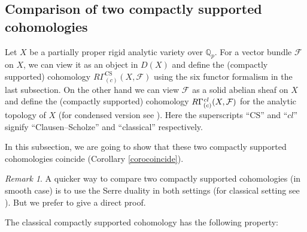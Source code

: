 \documentclass[a4paper,10pt]{amsart}
\theoremstyle{remark}
\newtheorem{remark}[theorem]{Remark}
\theoremstyle{definition}
\theoremstyle{plain}
\numberwithin{equation}{section}
\newcommand{\bbQ}{{\mathbb Q}}
\newcommand{\calF}{{\mathcal F}}
\newcommand{\CS}{\ensuremath{\mathrm{CS}}}
\begin{document}
\subsection{Comparison of two compactly supported cohomologies}\label{subseccompare}
Let $X$ be a partially proper rigid analytic variety over $\bbQ_p$. For a vector bundle $\calF$ on $X$, we can view it as an object in $D(X)$ and define the (compactly supported) cohomology $R\Gamma^{\CS}_{(c)}(X,\calF)$ using the six functor formalism in the last subsection. On the other hand we can view $\calF$ as a solid abelian sheaf on $X$ and define the (compactly supported) cohomology $R\Gamma_{(c)}^{\it cl}(X,\calF)$ for the analytic topology of $X$ \cite{abeLazda2025proper} (for condensed version see \cite[Appendix A]{li2026locallyanalyticvectorscompleted}). Here the superscripts ``$\CS$'' and ``$\mathit{cl}$'' signify ``Clausen--Scholze'' and ``classical'' respectively.

In this subsection, we are going to show that these two compactly supported cohomologies coincide (Corollary \ref{corocoincide}).


\begin{remark}
	A quicker way to compare two compactly supported cohomologies (in smooth case) is to use the Serre duality in both settings (for classical setting see \cite[\S~5]{achinger2025compactlysupportedpadicproetale}). But we prefer to give a direct proof.
\end{remark}


The classical compactly supported cohomology has the following property:
\end{document}
